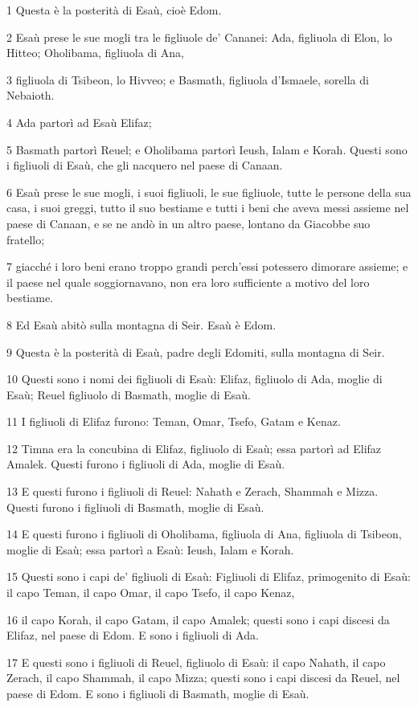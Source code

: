 \par 1 Questa è la posterità di Esaù, cioè Edom.
\par 2 Esaù prese le sue mogli tra le figliuole de' Cananei: Ada, figliuola di Elon, lo Hitteo; Oholibama, figliuola di Ana,
\par 3 figliuola di Tsibeon, lo Hivveo; e Basmath, figliuola d'Ismaele, sorella di Nebaioth.
\par 4 Ada partorì ad Esaù Elifaz;
\par 5 Basmath partorì Reuel; e Oholibama partorì Ieush, Ialam e Korah. Questi sono i figliuoli di Esaù, che gli nacquero nel paese di Canaan.
\par 6 Esaù prese le sue mogli, i suoi figliuoli, le sue figliuole, tutte le persone della sua casa, i suoi greggi, tutto il suo bestiame e tutti i beni che aveva messi assieme nel paese di Canaan, e se ne andò in un altro paese, lontano da Giacobbe suo fratello;
\par 7 giacché i loro beni erano troppo grandi perch'essi potessero dimorare assieme; e il paese nel quale soggiornavano, non era loro sufficiente a motivo del loro bestiame.
\par 8 Ed Esaù abitò sulla montagna di Seir. Esaù è Edom.
\par 9 Questa è la posterità di Esaù, padre degli Edomiti, sulla montagna di Seir.
\par 10 Questi sono i nomi dei figliuoli di Esaù: Elifaz, figliuolo di Ada, moglie di Esaù; Reuel figliuolo di Basmath, moglie di Esaù.
\par 11 I figliuoli di Elifaz furono: Teman, Omar, Tsefo, Gatam e Kenaz.
\par 12 Timna era la concubina di Elifaz, figliuolo di Esaù; essa partorì ad Elifaz Amalek. Questi furono i figliuoli di Ada, moglie di Esaù.
\par 13 E questi furono i figliuoli di Reuel: Nahath e Zerach, Shammah e Mizza. Questi furono i figliuoli di Basmath, moglie di Esaù.
\par 14 E questi furono i figliuoli di Oholibama, figliuola di Ana, figliuola di Tsibeon, moglie di Esaù; essa partorì a Esaù: Ieush, Ialam e Korah.
\par 15 Questi sono i capi de' figliuoli di Esaù: Figliuoli di Elifaz, primogenito di Esaù: il capo Teman, il capo Omar, il capo Tsefo, il capo Kenaz,
\par 16 il capo Korah, il capo Gatam, il capo Amalek; questi sono i capi discesi da Elifaz, nel paese di Edom. E sono i figliuoli di Ada.
\par 17 E questi sono i figliuoli di Reuel, figliuolo di Esaù: il capo Nahath, il capo Zerach, il capo Shammah, il capo Mizza; questi sono i capi discesi da Reuel, nel paese di Edom. E sono i figliuoli di Basmath, moglie di Esaù.
